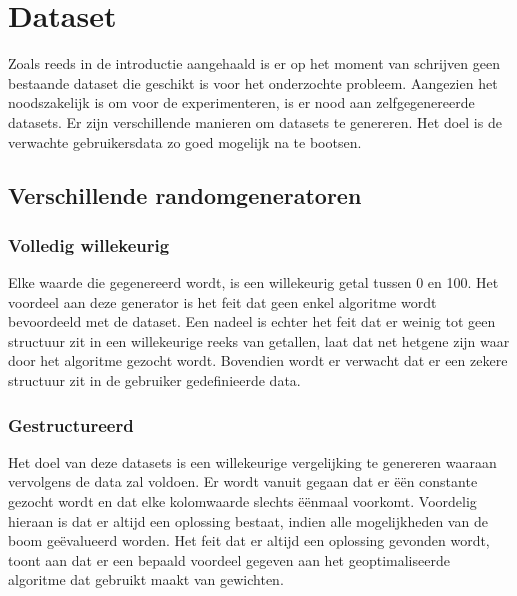 \documentclass[Main.tex]{subfiles}
\begin{document}
\section{Dataset}

Zoals reeds in de introductie aangehaald is er op het moment van schrijven geen bestaande dataset die geschikt is voor het onderzochte probleem. Aangezien het noodszakelijk is om voor de experimenteren, is er nood aan zelfgegenereerde datasets. Er zijn verschillende manieren om datasets te genereren. Het doel is de verwachte gebruikersdata zo goed mogelijk na te bootsen.
  
\subsection{Verschillende randomgeneratoren}
\subsubsection*{Volledig willekeurig}
Elke waarde die gegenereerd wordt, is een willekeurig getal tussen 0 en 100. Het voordeel aan deze generator is het feit dat geen enkel algoritme wordt bevoordeeld met de dataset. Een nadeel is echter het feit dat er weinig tot geen structuur zit in een willekeurige reeks van getallen, laat dat net hetgene zijn waar door het algoritme gezocht wordt. Bovendien wordt er verwacht dat er een zekere structuur zit in de gebruiker gedefinieerde data.

\subsubsection*{Gestructureerd}
Het doel van deze datasets is een willekeurige vergelijking te genereren waaraan vervolgens de data zal voldoen. Er wordt vanuit gegaan dat er \"e\"en constante gezocht wordt en dat elke kolomwaarde slechts \"e\"enmaal voorkomt. Voordelig hieraan is dat er altijd een oplossing bestaat, indien alle mogelijkheden van de boom ge\"evalueerd worden. Het feit dat er altijd een oplossing gevonden wordt, toont aan dat er een bepaald voordeel gegeven aan het geoptimaliseerde algoritme dat gebruikt maakt van gewichten.
\end{document}
